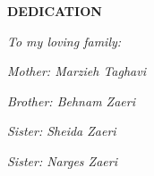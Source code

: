\newpage


\begin{center}
\textbf{DEDICATION}
\end{center}
\begin{center}
\textit{To my loving family:}
\end{center}
\begin{center}
	\textit{Mother: Marzieh Taghavi}
\end{center}

\begin{center}
	\textit{Brother: Behnam Zaeri}
\end{center}

\begin{center}
	\textit{Sister: Sheida Zaeri}
\end{center}

\begin{center}
	\textit{Sister: Narges Zaeri}
\end{center}
